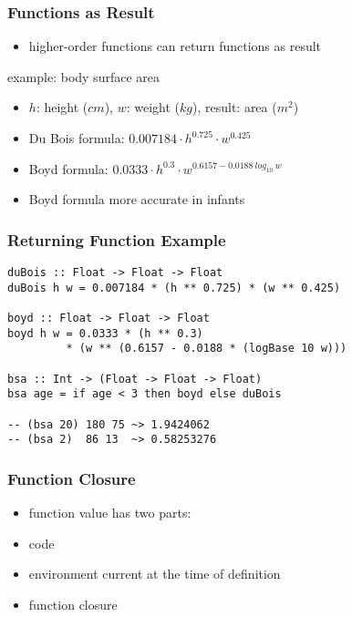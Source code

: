 \documentclass[dvipsnames]{beamer}
\theoremstyle{plain}
\begin{document}
\begin{frame}
  \frametitle{Functions as Result}

  \begin{itemize}
    \item higher-order functions can return functions as result
  \end{itemize}

  \begin{exampleblock}{example: body surface area}
    \begin{itemize}
      \item $h$: height ($cm$), $w$: weight ($kg$), result: area ($m^2$)
      \smallskip
      \item Du Bois formula:
        $0.007184 \cdot h^{0.725} \cdot w^{0.425}$\\
      \smallskip
      \item Boyd formula:
        $0.0333 \cdot h^{0.3} \cdot w^{0.6157 - 0.0188~log_{10}~w}$
      \smallskip
      \item Boyd formula more accurate in infants
    \end{itemize}
  \end{exampleblock}
\end{frame}

\begin{frame}[fragile]
  \frametitle{Returning Function Example}

  \begin{lstlisting}
duBois :: Float -> Float -> Float
duBois h w = 0.007184 * (h ** 0.725) * (w ** 0.425)

boyd :: Float -> Float -> Float
boyd h w = 0.0333 * (h ** 0.3)
         * (w ** (0.6157 - 0.0188 * (logBase 10 w)))

bsa :: Int -> (Float -> Float -> Float)
bsa age = if age < 3 then boyd else duBois

-- (bsa 20) 180 75 ~> 1.9424062
-- (bsa 2)  86 13  ~> 0.58253276
  \end{lstlisting}
\end{frame}

\begin{frame}[fragile]
  \frametitle{Function Closure}

  \begin{itemize}
    \item function value has two parts:

    \medskip
    \item code
    \item environment current at the time of definition

    \medskip
    \item function \alert{closure}
  \end{itemize}
\end{frame}
\end{document}
